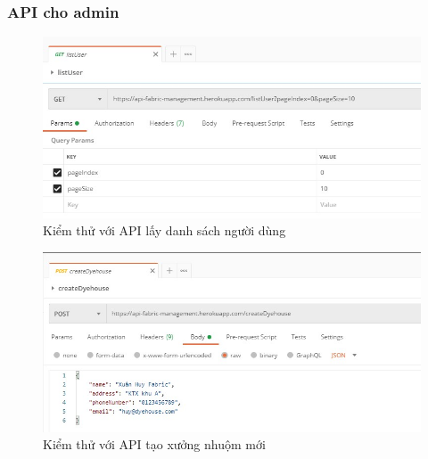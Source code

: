 \subsubsection{API cho admin}
\begin{figure}[H]
    \begin{center}
        \includegraphics[width=12cm]{Image/API/40_listUser.jpg}
        \caption{Kiểm thử với API lấy danh sách người dùng}
        \label{listUser}
    \end{center}
\end{figure}
\begin{figure}[H]
    \begin{center}
        \includegraphics[width=12cm]{Image/API/41_createDyehouse.jpg}
        \caption{Kiểm thử với API tạo xưởng nhuộm mới}
        \label{createDyehouse}
    \end{center}
\end{figure}